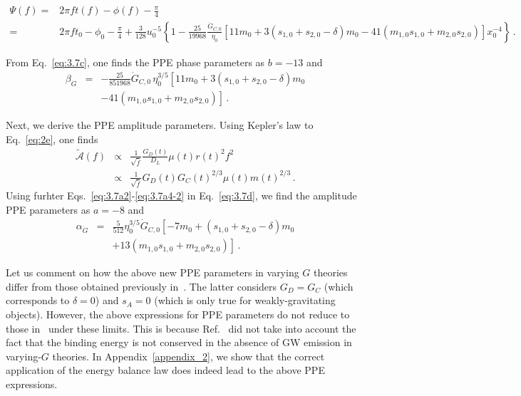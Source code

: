 \documentclass[prd,twocolumn,nofootinbib]{revtex4-1}
\newcommand\bw{\begin{widetext}}
\newcommand\ew{\end{widetext}}
\newcommand{\GR}{{\mbox{\tiny GR}}}
\begin{document}
\bw
\begin{align}\label{eq:3.7c}
\Psi(f)=&2\pi ft(f)-\phi(f)-\frac{\pi}{4}\nonumber\\
=&2\pi f t_0-\phi_0-\frac{\pi}{4}+\frac{3}{128}u_0^{-5}\left\{1-\frac{25}{19968}\frac{\dot{G}_{C,0}}{\eta_0}\left[11m_0+3(s_{1,0}+s_{2,0}-\delta)m_0-41 (m_{1,0}s_{1,0}+m_{2,0}s_{2,0})\right]x_0^{-4} \right\}\,.
\end{align}
\ew
From Eq.~\eqref{eq:3.7c}, one finds the PPE phase parameters as $b=-13$ and
 \begin{eqnarray}\label{eq:beta_gdot}
 \beta_{\dot{G}}&=&-\frac{25}{851968}\dot{G}_{C,0}\,\eta_0^{3/5}\left[11m_0 +3(s_{1,0}+s_{2,0}-\delta)m_0 \right. \nonumber \\
 && \left. -41 (m_{1,0}s_{1,0}+m_{2,0}s_{2,0})\right]\,. 
  \end{eqnarray}

Next, we derive the PPE amplitude parameters.
Using Kepler's law to Eq.~\eqref{eq:2e}, one finds
\begin{eqnarray}\label{eq:3.7d}
\tilde{\mathcal{A}}(f)&\propto&\frac{1}{\sqrt{\dot{f}}}\frac{G_D(t)}{D_L}\mu(t) r(t)^2f^2 \nonumber \\
&\propto&\frac{1}{\sqrt{\dot{f}}}G_D(t){G_C(t)}^{2/3}\mu(t){m(t)}^{2/3} \,.
\end{eqnarray} 
Using furhter Eqs.~\eqref{eq:3.7a2}-\eqref{eq:3.7a4-2} in Eq.~\eqref{eq:3.7d}, we find the amplitude PPE parameters as $a = -8$ and
\begin{eqnarray}
\label{eq:3.7d2}
 \alpha_{\dot{G}}&=&\frac{5}{512}\eta_0^{3/5}\dot{G}_{C,0}\left[-7m_0+(s_{1,0}+s_{2,0}-\delta)m_0 \right. \nonumber \\
 && \left.+13 (m_{1,0}s_{1,0}+m_{2,0}s_{2,0})\right]\,.
 \end{eqnarray}

Let us comment on how the above new PPE parameters in varying $G$ theories differ from those obtained previously in~\cite{Yunes:2009bv}. The latter considers $G_D = G_C$ (which corresponds to $\delta = 0$) and $s_A = 0$ (which is only true for weakly-gravitating objects). However, the above expressions for PPE parameters do not reduce to those in~\cite{Yunes:2009bv} under these limits. This is because Ref.~\cite{Yunes:2009bv} did not take into account the fact that the binding energy is not conserved in the absence of GW emission in varying-$G$ theories. In Appendix~\ref{appendix_2}, we show that the correct application of the energy balance law does indeed lead to the above PPE expressions.
 
\end{document}
